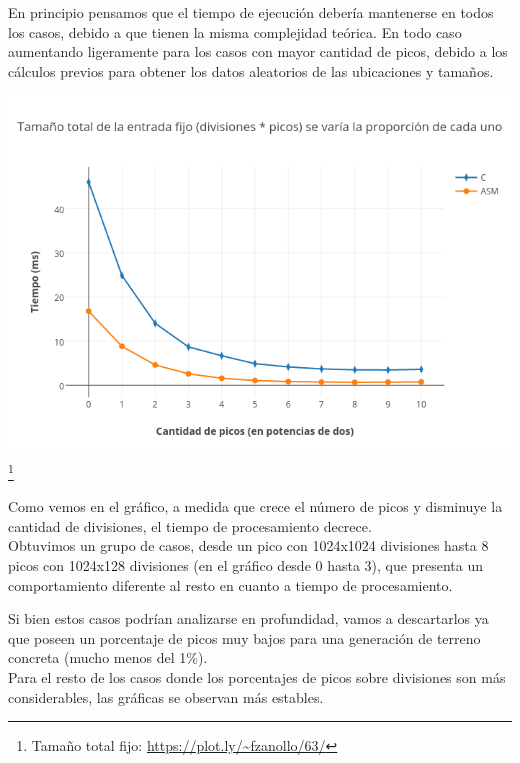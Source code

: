 En principio pensamos que el tiempo de ejecución debería mantenerse en todos los casos, debido a que tienen la misma complejidad teórica. En todo caso aumentando ligeramente para los casos con mayor cantidad de picos, debido a los cálculos previos para obtener los datos aleatorios de las ubicaciones y tamaños.

\includegraphics[scale=0.6]{imagenes/tamanioTotalFijo.png} \footnote{ Tamaño total fijo: \url{https://plot.ly/~fzanollo/63/}} 

Como vemos en el gráfico, a medida que crece el número de picos y disminuye la cantidad de divisiones, el tiempo de procesamiento decrece.\\

Obtuvimos un grupo de casos, desde un pico con 1024x1024 divisiones hasta 8 picos con 1024x128 divisiones (en el gráfico desde 0 hasta 3), que presenta un comportamiento diferente al resto en cuanto a tiempo de procesamiento.

Si bien estos casos podrían analizarse en profundidad, vamos a descartarlos ya que poseen un porcentaje de picos muy bajos para una generación de terreno concreta (mucho menos del 1$\%$).\\

Para el resto de los casos donde los porcentajes de picos sobre divisiones son más considerables, las gráficas se observan más estables.